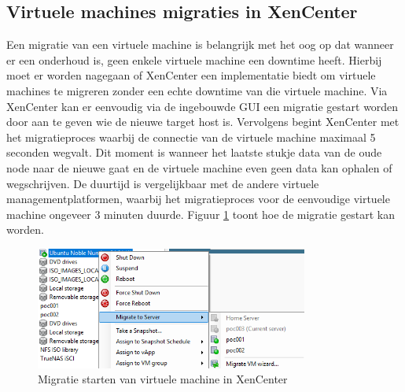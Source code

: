 \subsection{Virtuele machines migraties in XenCenter}%
Een migratie van een virtuele machine is belangrijk met het oog op dat wanneer er een onderhoud is, geen enkele virtuele machine een downtime heeft.
Hierbij moet er worden nagegaan of XenCenter een implementatie biedt om virtuele machines te migreren zonder een echte downtime van die virtuele machine.
Via XenCenter kan er eenvoudig via de ingebouwde GUI een migratie gestart worden door aan te geven wie de nieuwe target host is.
Vervolgens begint XenCenter met het migratieproces waarbij de connectie van de virtuele machine maximaal 5 seconden wegvalt.
Dit moment is wanneer het laatste stukje data van de oude node naar de nieuwe gaat en de virtuele machine even geen data kan ophalen of wegschrijven.
De duurtijd is vergelijkbaar met de andere virtuele managementplatformen, waarbij het migratieproces voor de eenvoudige virtuele machine ongeveer 3 minuten duurde.
Figuur \ref{fig:migrate-vm-xen} toont hoe de migratie gestart kan worden.
\begin{figure}[H]
\centering
\includegraphics[width=0.8\textwidth]{../poc/migrate-vm-xen.png}
\caption{Migratie starten van virtuele machine in XenCenter}
\label{fig:migrate-vm-xen}
\end{figure}

